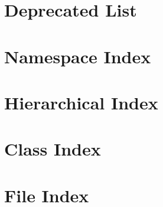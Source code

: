 \documentclass[twoside]{book}
\newcommand{\+}{\discretionary{\mbox{\scriptsize$\hookleftarrow$}}{}{}}
\begin{document}
\chapter{Deprecated List}
\label{deprecated}

\chapter{Namespace Index}

\chapter{Hierarchical Index}

\chapter{Class Index}

\chapter{File Index}

\end{document}
